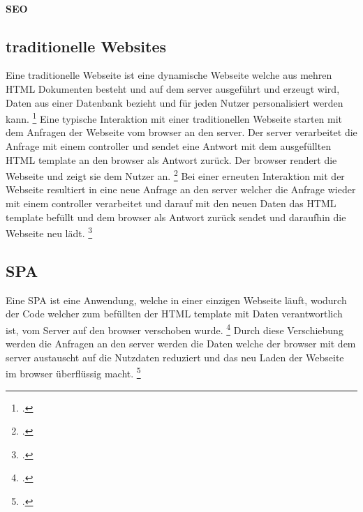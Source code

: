 \paragraph*{SEO}

\subsection{traditionelle Websites}
Eine traditionelle Webseite ist eine dynamische Webseite welche aus mehren \ac{HTML} Dokumenten besteht und auf dem \gls{server} ausgeführt und erzeugt wird, Daten aus einer Datenbank bezieht und für jeden Nutzer personalisiert werden kann. \footcite[Vgl.][Seite 32]{Robbins2018}
Eine typische Interaktion mit einer traditionellen Webseite starten mit dem Anfragen der Webseite vom \gls{browser} an den \gls{server}.
Der \gls{server} verarbeitet die Anfrage mit einem \gls{controller} und sendet eine Antwort mit dem ausgefüllten \ac{HTML} \gls{template} an den \gls{browser} als Antwort zurück.
Der \gls{browser} rendert die Webseite und zeigt sie dem Nutzer an. \footcite[Vgl. ][Seite 32]{Robbins2018}
Bei einer erneuten Interaktion mit der Webseite resultiert in eine neue Anfrage an den \gls{server} welcher die Anfrage wieder mit einem \gls{controller} verarbeitet und darauf mit
den neuen Daten das \ac{HTML} \gls{template} befüllt und dem \gls{browser} als Antwort zurück sendet und daraufhin die Webseite neu lädt. \footcite[Vgl. ][Seite 5]{Scott2015}


\subsection{\ac{SPA}}
Eine \ac{SPA} ist eine Anwendung, welche in einer einzigen Webseite läuft, wodurch der Code welcher zum befüllten der \ac{HTML} \gls{template} mit Daten verantwortlich ist, vom Server auf den \gls{browser} verschoben wurde. \footcite[Vgl.][Seite 4]{Scott2015}
Durch diese Verschiebung werden die Anfragen an den \gls{server} werden die Daten welche der \gls{browser} mit dem \gls{server} austauscht auf die Nutzdaten reduziert und das neu Laden der Webseite im \gls{browser} überflüssig macht. \footcite[Vgl.][Seite 7]{Scott2015}
